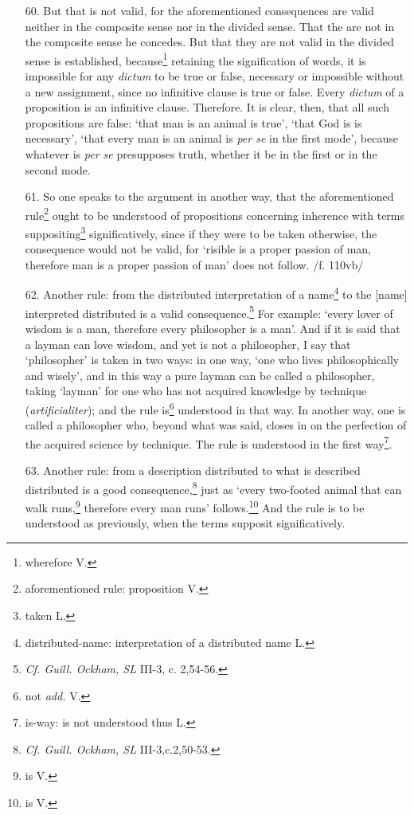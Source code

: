 \documentclass[]{article}
\begin{document}
\begin{enumerate}
	\item[60.] But that is not valid, for the aforementioned consequences are valid neither in the composite sense nor in the divided sense. That the are not in the composite sense he concedes. But that they are not valid in the divided sense is established, because\footnote{wherefore V.} retaining the signification of words, it is impossible for any \textit{dictum} to be true or false, necessary or impossible without a new assignment, since no infinitive clause is true or false. Every \textit{dictum} of a proposition is an infinitive clause. Therefore. It is clear, then, that all such propositions are false: `that man is an animal is true', `that God is is necessary', `that every man is an animal is \textit{per se} in the first mode', because whatever is \textit{per se} presupposes truth, whether it be in the first or in the second mode. 
	\item[61.] So one speaks to the argument in another way, that the aforementioned rule\footnote{aforementioned rule: proposition V.} ought to be understood of propositions concerning inherence with terms suppositing\footnote{taken L.} significatively, since if they were to be taken otherwise, the consequence would not be valid, for `risible is a proper passion of man, therefore man is a proper passion of man' does not follow. /f. 110vb/
	\item[62.] Another rule: from the distributed interpretation of a name\footnote{distributed-name: interpretation of a distributed name L.} to the [name] interpreted distributed is a valid consequence.\footnote{\textit{Cf. Guill. Ockham, SL} III-3, c. 2,54-56.} For example: `every lover of wisdom is a man, therefore every philosopher is a man'. And if it is said that a layman can love wisdom, and yet is not a philosopher, I say that `philosopher' is taken in two ways: in one way, `one who lives philosophically and wisely', and in this way a pure layman can be called a philosopher, taking `layman' for one who has not acquired knowledge by technique (\textit{artificialiter}); and the rule is\footnote{not \textit{add.} V.} understood in that way. In another way, one is called a philosopher who, beyond what was said, closes in on the perfection of the acquired science by technique. The rule is understood in the first way\footnote{is-way: is not understood thus L.}.
	\item[63.] Another rule: from a description distributed to what is described distributed is a good consequence,\footnote{\textit{Cf. Guill. Ockham, SL} III-3,c.2,50-53.} just as `every two-footed animal that can walk runs,\footnote{is V.} therefore every man runs' follows.\footnote{is V.} And the rule is to be understood as previously, when the terms supposit significatively. 

\end{enumerate}
\end{document}
